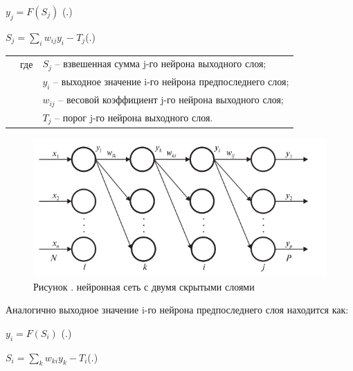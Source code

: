 	\formulaspace \par \redline 
	$y_{j} = F(S_{j}) $
	\hfill (\thechaptercntr .\theformulacntr) \redline
	\formulaspace \addtocounter{formulacntr}{1}
	
	\formulaspace \par \redline 
	$S_{j} = \sum \limits _{i}^{} w_{ij}y_{i} - T_{j}$\hfill (\thechaptercntr .\theformulacntr) \redline
	\formulaspace \addtocounter{formulacntr}{1}
	
	\begin{tabular}{p{}p{}p{}}
		& где  & $S_{j}$ {--} взвешенная сумма j-го нейрона выходного слоя; \\
		&      & $y_{i}$ {--} выходное значение i-го нейрона предпоследнего слоя; \\
		&      & $w_{ij}$ {--} весовой коэффициент j-го нейрона выходного слоя; \\
		&      & $T_{j}$ {--} порог j-го нейрона выходного слоя. \\
	\end{tabular}
	
	\begin{figure}[H]
		\centering
		\def\svgwidth{\textwidth}
		\includegraphics[scale=1.2]{images/bpe_perceptron.png}
		\caption*{\gostFont Рисунок \thechaptercntr .\theimagecntr \spc {--} нейронная сеть с двумя скрытыми слоями}
	\end{figure}  \addtocounter{imagecntr}{1}
	
	
	\par \redline Аналогично выходное значение i-го нейрона предпоследнего слоя находится как:
	
		\formulaspace \par \redline 
	$y_{i} = F(S_{i}) $
	\hfill (\thechaptercntr .\theformulacntr) \redline
	\formulaspace \addtocounter{formulacntr}{1}
	
	\formulaspace \par \redline 
	$S_{i} = \sum \limits _{k}^{} w_{ki}y_{k} - T_{i}$\hfill (\thechaptercntr .\theformulacntr) \redline
	\formulaspace \addtocounter{formulacntr}{1}
	
